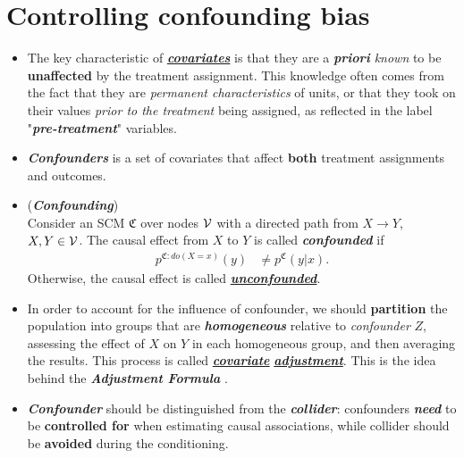 \documentclass[11pt]{article}
\begin{document}
\section{Controlling confounding bias}
\begin{itemize}
\item  The key characteristic of \underline{\emph{\textbf{covariates}}} is that they are a \emph{\textbf{priori} known} to be \textbf{unaffected} by the treatment assignment. This knowledge often comes from the fact that they are \emph{permanent characteristics} of units, or that they took on their values \emph{prior to the treatment} being assigned, as reflected in the label "\emph{\textbf{pre-treatment}}" variables. 

\item \textbf{\emph{Confounders}} is a set of covariates that affect \textbf{both} treatment assignments and outcomes.  

\item 
\begin{definition} (\textbf{\emph{Confounding}}) \citep{peters2017elements} \\
Consider an SCM  $\mathfrak{C}$ over nodes ${\mathcal V}$ with a directed path from $X \rightarrow Y$, $X, Y \in {\mathcal V}$. The causal effect from $X$ to $Y$ is called \emph{\textbf{confounded}} if
\begin{align}
p^{\mathfrak{C}: do(X=x)}(y) &\neq p^{\mathfrak{C}}(y | x). \label{eqn: confounding}
\end{align}
Otherwise, the causal effect is called \underline{\textbf{\emph{unconfounded}}}.
\end{definition}

\item In order to account for the influence of confounder, we should \textbf{partition} the population into groups that are \emph{\textbf{homogeneous}} relative to \emph{confounder} $Z$, assessing the effect of $X$ on $Y$ in each homogeneous group, and then averaging the results. This process is called \underline{\textbf{\emph{covariate}}} \underline{\textbf{\emph{adjustment}}}. This is the idea behind the \emph{\textbf{Adjustment Formula}}  \citep{imbens2015causal}.

\item \emph{\textbf{Confounder}} should be distinguished from the \emph{\textbf{collider}}: confounders \emph{\textbf{need}} to be \textbf{controlled for} when estimating causal associations, while collider should be \textbf{avoided} during the conditioning.
\end{itemize}
\end{document}
